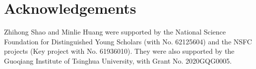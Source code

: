 \documentclass[11pt]{article}
\begin{document}

\section*{Acknowledgements}
Zhihong Shao and Minlie Huang were supported by the National Science Foundation for Distinguished Young Scholars (with No. 62125604) and the NSFC projects (Key project with No. 61936010).
They were also supported by the Guoqiang Institute of Tsinghua University, with Grant No. 2020GQG0005.

\newpage




\newpage

\appendix


\end{document}
